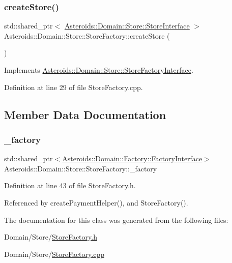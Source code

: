 \subsubsection{\texorpdfstring{create\+Store()}{createStore()}}
{\footnotesize\ttfamily std\+::shared\+\_\+ptr$<$ \hyperlink{classAsteroids_1_1Domain_1_1Store_1_1StoreInterface}{Asteroids\+::\+Domain\+::\+Store\+::\+Store\+Interface} $>$ Asteroids\+::\+Domain\+::\+Store\+::\+Store\+Factory\+::create\+Store (\begin{DoxyParamCaption}{ }\end{DoxyParamCaption})\hspace{0.3cm}{\ttfamily [virtual]}}



Implements \hyperlink{classAsteroids_1_1Domain_1_1Store_1_1StoreFactoryInterface_a90c8a34020605c4c2e311e0997677298}{Asteroids\+::\+Domain\+::\+Store\+::\+Store\+Factory\+Interface}.



Definition at line 29 of file Store\+Factory.\+cpp.



\subsection{Member Data Documentation}
\mbox{\label{classAsteroids_1_1Domain_1_1Store_1_1StoreFactory_aa074ae6116833b7ff3d3fb86e1ba1291}} 
\subsubsection{\texorpdfstring{\+\_\+factory}{\_factory}}
{\footnotesize\ttfamily std\+::shared\+\_\+ptr$<$\hyperlink{classAsteroids_1_1Domain_1_1Factory_1_1FactoryInterface}{Asteroids\+::\+Domain\+::\+Factory\+::\+Factory\+Interface}$>$ Asteroids\+::\+Domain\+::\+Store\+::\+Store\+Factory\+::\+\_\+factory\hspace{0.3cm}{\ttfamily [private]}}



Definition at line 43 of file Store\+Factory.\+h.



Referenced by create\+Payment\+Helper(), and Store\+Factory().



The documentation for this class was generated from the following files\+:\begin{DoxyCompactItemize}
\item 
Domain/\+Store/\hyperlink{StoreFactory_8h}{Store\+Factory.\+h}\item 
Domain/\+Store/\hyperlink{StoreFactory_8cpp}{Store\+Factory.\+cpp}\end{DoxyCompactItemize}
